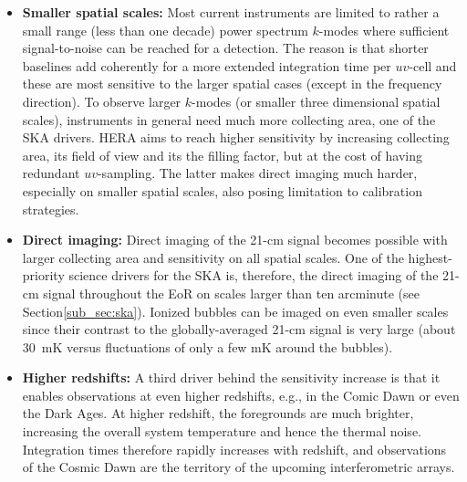 \begin{itemize}
  
\item {\bf Smaller spatial scales:} Most current instruments are limited to rather a small range (less than one decade) power spectrum $k$-modes where sufficient signal-to-noise can be reached for a detection. The reason is that shorter baselines add coherently for a more extended integration time per $uv$-cell and these are most sensitive to the larger spatial cases (except in the frequency direction). To observe larger $k$-modes (or smaller three dimensional spatial scales), instruments in general need much more collecting area, one of the SKA drivers. HERA aims to reach higher sensitivity by  increasing collecting area, its field of view and its the filling factor, but at the cost of having redundant $uv$-sampling. The latter makes direct imaging much harder, especially on smaller spatial scales, also posing limitation to calibration strategies. 
    
\item {\bf Direct imaging:} Direct imaging of the 21-cm signal becomes possible with larger collecting area and sensitivity on all spatial scales. One of the highest-priority science drivers for the SKA is, therefore, the direct imaging  of the 21-cm signal throughout the EoR on scales larger than ten arcminute (see Section\ref{sub_sec:ska}). Ionized bubbles can be imaged on even smaller scales since their contrast to the globally-averaged 21-cm signal is very large (about 30~mK versus fluctuations of only a few mK around the bubbles). 

\item {\bf Higher redshifts:} A third driver behind the sensitivity increase is that it enables observations at even higher redshifts, e.g., in the Comic Dawn or even the Dark Ages. At higher redshift, the foregrounds are much brighter, increasing the overall system temperature and hence the thermal noise. Integration times therefore rapidly increases with redshift, and observations of the Cosmic Dawn are the territory of the upcoming interferometric arrays.
\end{itemize}

